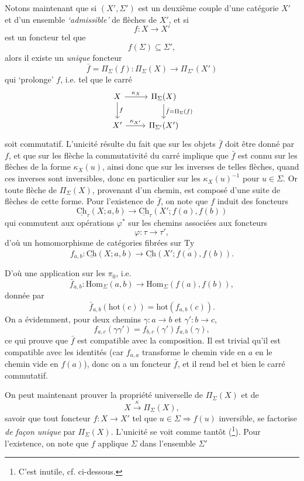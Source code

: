 \documentclass[11pt]{article}
\newcommand{\printedpage}[1]{\marginpar{\footnotesize p.~#1}}
\newcommand{\msp}[1]{\marginpar{\vspace*{10pt}\footnotesize [#1]}}
\newcommand{\uTy}{\underline{\mathrm{Ty}}}
\newcommand{\Ch}{\underline{\mathrm{Ch}}}
\newcommand{\Hom}{\mathrm{Hom}}
\newcommand{\hot}{\mathrm{hot}}
\begin{document}
Notons maintenant que si $(X', \Sigma')$ est un deuxième couple d'une catégorie $X'$ et d'un ensemble \textit{`admissible'} de flèches de $X'$, et si
\[
f : X \longrightarrow X'
\]
est un foncteur tel que
\[
f(\Sigma) \subseteq \Sigma',
\]
alors il existe un \textit{unique} foncteur
\[
\bar{f} = \Pi_\Sigma(f) : \Pi_\Sigma(X) \longrightarrow \Pi_{\Sigma'}(X')
\]
qui `prolonge' $f$, i.e. tel que le carré
\printedpage{48}
\msp{page 72}
\[
\begin{tikzcd}
X \arrow[r, "\kappa_X"] \arrow[d, "{\scriptstyle f}"] & \Pi_\Sigma(X) \arrow[d, "{\scriptstyle \bar{f} = \Pi_\Sigma(f)}"] \\
X' \arrow[r, "\kappa_{X'}"] & \Pi_{\Sigma'}(X')
\end{tikzcd}
\]
soit commutatif. L'unicité résulte du fait que sur les objets $\bar{f}$ doit être donné par $f$, et que sur les flèche la commutativité du carré implique que $\bar{f}$ est connu sur les flèches de la forme $\kappa_X(u)$, ainsi donc que sur les inverses de telles flèches, quand ces inverses sont inversibles, donc en particulier sur les $\kappa_X(u)^{-1}$ pour $u \in \Sigma$. Or toute flèche de $\Pi_\Sigma(X)$, provenant d'un chemin, est composé d'une suite de flèches de cette forme. Pour l'existence de $\bar{f}$, on note que $f$ induit des foncteurs %
\[
\Ch_\tau(X; a, b) \longrightarrow \Ch_\tau(X'; f(a), f(b))
\]
qui commutent aux opérations $\varphi^*$ sur les chemins associées aux foncteurs
\[
\varphi : \tau \longrightarrow \tau',
\]
d'où un homomorphisme de catégories fibrées sur $\uTy$
\[
f_{a,b} : \Ch(X; a, b) \longrightarrow \Ch(X'; f(a), f(b)).
\]

\msp{page 73}

D'où une application sur les $\pi_0$, i.e.
\[
\bar{f}_{a,b} : \Hom_\Sigma(a,b) \longrightarrow \Hom_\Sigma(f(a), f(b)),
\]
donnée par
\[
\bar{f}_{a,b}(\hot(c)) = \hot(f_{a,b}(c)).
\]
On a évidemment, pour deux chemins $\gamma : a \longrightarrow b$ et $\gamma' : b \longrightarrow c$,
\[
f_{a,c}(\gamma\gamma') = f_{b,c}(\gamma')f_{a,b}(\gamma),
\]
ce qui prouve que $\bar{f}$ est compatible avec la composition. Il est trivial qu'il est compatible avec les identités (car $f_{a,a}$ transforme le chemin vide en $a$ en le chemin vide en $f(a)$), donc on a un foncteur $\bar{f}$, et il rend bel et bien le carré commutatif.

On peut maintenant prouver la propriété universelle de $\Pi_\Sigma(X)$ et de
\[
X \xrightarrow{\ \kappa\ } \Pi_\Sigma(X),
\]
savoir que tout foncteur $f : X \longrightarrow X'$ tel que $u \in \Sigma \Longrightarrow f(u)$ inversible, se factorise \textit{de façon unique} par $\Pi_\Sigma(X)$. L'unicité se voit comme tantôt (\footnote[20]{C'est inutile, cf. ci-dessous.}). Pour l'existence, on note que $f$ applique $\Sigma$ dans l'ensemble $\Sigma'$
\end{document}
